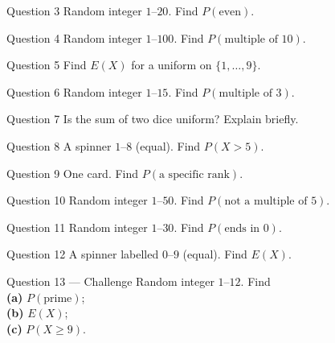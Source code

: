 \documentclass[11pt]{article}
\begin{document}
\begin{qbox}{Question 3}
Random integer $1$--$20$. Find $P(\text{even})$.\workspace{2.4cm}
\end{qbox}

\begin{qbox}{Question 4}
Random integer $1$--$100$. Find $P(\text{multiple of }10)$.\workspace{2.4cm}
\end{qbox}

\begin{qbox}{Question 5}
Find $E(X)$ for a uniform on $\{1,\dots,9\}$.\workspace{2.4cm}
\end{qbox}

\begin{qbox}{Question 6}
Random integer $1$--$15$. Find $P(\text{multiple of }3)$.\workspace{2.4cm}
\end{qbox}

\begin{qbox}{Question 7}
Is the sum of two dice uniform? Explain briefly.\workspace{2.4cm}
\end{qbox}

\begin{qbox}{Question 8}
A spinner $1$--$8$ (equal). Find $P(X>5)$.\workspace{2.4cm}
\end{qbox}

\begin{qbox}{Question 9}
One card. Find $P(\text{a specific rank})$.\workspace{2.4cm}
\end{qbox}

\begin{qbox}{Question 10}
Random integer $1$--$50$. Find $P(\text{not a multiple of }5)$.\workspace{2.4cm}
\end{qbox}

\begin{qbox}{Question 11}
Random integer $1$--$30$. Find $P(\text{ends in }0)$.\workspace{2.4cm}
\end{qbox}

\begin{qbox}{Question 12}
A spinner labelled $0$--$9$ (equal). Find $E(X)$.\workspace{2.4cm}
\end{qbox}

\begin{qbox}{Question 13 --- Challenge}
Random integer $1$--$12$. Find \\ \textbf{(a)} $P(\text{prime})$; \\ \textbf{(b)} $E(X)$; \\ \textbf{(c)} $P(X\ge9)$.\workspace{3cm}
\end{qbox}
\end{document}
